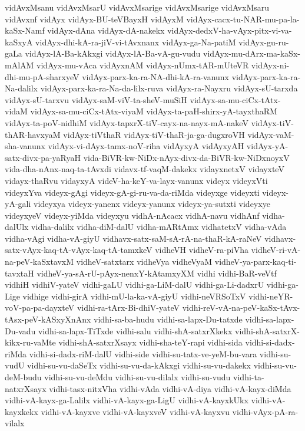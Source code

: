 {vidAvxMsanu
vidAvxMsarU
vidAvxMsarige
vidAvxMsarige
vidAvxMsaru
vidAvxnf
vidAyx
vidAyx-BU-teVBayxH
vidAyxM
vidAyx-cacx-tu-NAR-mu-pa-la-kaSx-Namf
vidAyx-dAna
vidAyx-dA-nakekx
vidAyx-dedxV-ha-vAyx-pitx-vi-va-kaSxyA
vidAyx-dhi-kA-ra-jiV-vi-tAvxnanx
vidAyx-ga-Na-patiM
vidAyx-gu-ru-gaLa
vidAyx-lA-Ba-kAkxgi
vidAyx-lA-Ba-vA-gu-vudu
vidAyx-mu-dArx-ma-kaSx-mAlAM
vidAyx-mu-vAca
vidAyxnAM
vidAyx-nUmx-tAR-mUteVR
vidAyx-ni-dhi-mu-pA-sharxyeV
vidAyx-parx-ka-ra-NA-dhi-kA-ra-vanunx
vidAyx-parx-ka-ra-Na-dalilx
vidAyx-parx-ka-ra-Na-da-lilx-ruva
vidAyx-ra-Nayxru
vidAyx-sU-tarxda
vidAyx-sU-tarxvu
vidAyx-saM-viV-ta-sheV-muSiH
vidAyx-sa-mu-ciCx-tAtx-vidaM
vidAyx-sa-mu-ciCx-tAtx-viyaM
vidAyx-ta-paH-shirx-yA-tayxthaRM
vidAyx-ta-poV-nidhiM
vidAyx-tapxrX-tiV-cayx-na-nayx-mA-nakeV
vidAyx-tiV-thAR-havxyaM
vidAyx-tiVthaR
vidAyx-tiV-thaR-ja-ga-dugxroVH
vidAyx-vaM-sha-vanunx
vidAyx-vi-dAyx-tamx-noV-riha
vidAyxyA
vidAyxyAH
vidAyx-yA-satx-divx-pa-yaRyaH
vida-BiVR-kw-NiDx-nAyx-divx-da-BiVR-kw-NiDxnoyxV
vida-dha-nAnx-naq-ta-tAvxdi
vidavx-tf-vaqM-dakekx
vidayxnetxV
vidayxteV
vidayx-thaRvu
vidayxyA
videV-ha-keY-va-layx-vanunx
videyx
videyxVti
videyxYva
videyx-gAgi
videyx-gA-gi-ru-va-da-riMda
videyxge
videyxti
videyx-yA-gali
videyxya
videyx-yanenx
videyx-yanunx
videyx-ya-sutxti
videyxye
videyxyeV
videyx-yiMda
videyxyu
vidhA-nAcacx
vidhA-navu
vidhAnf
vidha-dalUlx
vidha-dalilx
vidha-diM-dalU
vidha-mARtAmx
vidhatetxV
vidha-vAda
vidha-vAgi
vidha-vA-giyU
vidhavx-satx-saM-sA-rA-na-thaR-kA-raNeV
vidhavx-satx-vAyx-kaq-tA-vAyx-kaq-tA-tamxkeV
vidheVH
vidheV-ra-piVha
vidheV-ri-vA-na-peV-kaSxtavxM
vidheV-satxtarx
vidheVya
vidheVyaM
vidheV-ya-parx-kaq-ti-tavxtaH
vidheV-ya-sA-rU-pAyx-nenxY-kAtamxyXM
vidhi
vidhi-BaR-veVtf
vidhiH
vidhiV-yateV
vidhi-gaLU
vidhi-ga-LiM-dalU
vidhi-ga-Li-dadxrU
vidhi-ga-Lige
vidhige
vidhi-girA
vidhi-mU-la-ka-vA-giyU
vidhi-neVRSoTxV
vidhi-neYR-voV-pa-pa-dayxteV
vidhi-ra-tArx-Bi-dhiV-yateV
vidhi-reV-vA-na-peV-kaSx-tAvx-tAsx-peV-kASxyXnAnx
vidhi-sa-ba-hudu
vidhi-sa-lapx-Du-tatxde
vidhi-sa-lapx-Du-vadu
vidhi-sa-lapx-TiTxde
vidhi-salu
vidhi-shA-satxrXkekx
vidhi-shA-satxrX-kikx-ru-vaMte
vidhi-shA-satxrXsayx
vidhi-sha-teY-rapi
vidhi-sida
vidhi-si-dadx-riMda
vidhi-si-dadx-riM-dalU
vidhi-side
vidhi-su-tatx-ve-yeM-bu-vara
vidhi-su-vudU
vidhi-su-vu-daSeTx
vidhi-su-vu-da-kAkxgi
vidhi-su-vu-dakekx
vidhi-su-vu-deM-budu
vidhi-su-vu-deMdu
vidhi-su-vu-dilalx
vidhi-su-vudu
vidhi-ta-natxrXsayx
vidhi-tasx-nitxVha
vidhi-vAda
vidhi-vA-diya
vidhi-vA-kayx-diMda
vidhi-vA-kayx-ga-Lalilx
vidhi-vA-kayx-ga-LigU
vidhi-vA-kayxkUkx
vidhi-vA-kayxkekx
vidhi-vA-kayxve
vidhi-vA-kayxveV
vidhi-vA-kayxvu
vidhi-vAyx-pA-ra-vilalx
}
